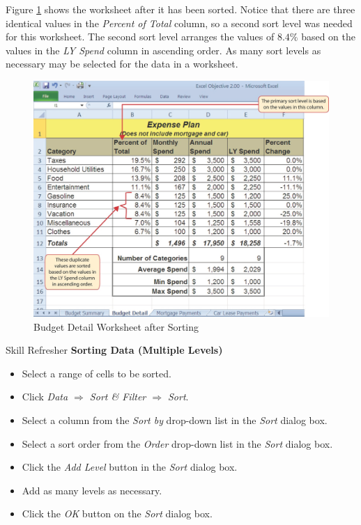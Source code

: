 Figure \ref{02:fig28} shows the  worksheet after it has been sorted. Notice that there are three identical values in the \textit{Percent of Total} column, so a second sort level was needed for this worksheet. The second sort level arranges the values of $ 8.4\% $ based on the values in the \textit{LY Spend} column in ascending order. As many sort levels as necessary may be selected for the data in a worksheet.

\begin{figure}[H]
	\centering
	\includegraphics[width=\maxwidth{.95\linewidth}]{gfx/ch02_fig28}
	\caption{Budget Detail Worksheet after Sorting}
	\label{02:fig28}
\end{figure}

\begin{center}
	\begin{sklbox}{Skill Refresher}
		\textbf{Sorting Data (Multiple Levels)}
		\\
		\begin{itemize}
			\setlength{\itemsep}{0pt}
			\setlength{\parskip}{0pt}
			\setlength{\parsep}{0pt}
			
			\item Select a range of cells to be sorted.
			\item Click \textit{Data $ \Rightarrow $ Sort \& Filter $ \Rightarrow $ Sort}.
			\item Select a column from the \textit{Sort by} drop-down list in the \textit{Sort} dialog box.
			\item Select a sort order from the \textit{Order} drop-down list in the \textit{Sort} dialog box.
			\item Click the \textit{Add Level} button in the \textit{Sort} dialog box.
			\item Add as many levels as necessary.
			\item Click the \textit{OK} button on the \textit{Sort} dialog box.
			
		\end{itemize}
	\end{sklbox}
\end{center}

